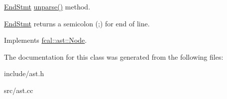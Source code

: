 \hyperlink{classfcal_1_1ast_1_1EndStmt}{End\+Stmt} \hyperlink{classfcal_1_1ast_1_1EndStmt_ab1900c9948ccc1a1cd8eca29cebb9baa}{unparse()} method. 

\hyperlink{classfcal_1_1ast_1_1EndStmt}{End\+Stmt} returns a semicolon (;) for end of line. 

Implements \hyperlink{classfcal_1_1ast_1_1Node_a81865f5a1df593708a39bf492952742a}{fcal\+::ast\+::\+Node}.



The documentation for this class was generated from the following files\+:\begin{DoxyCompactItemize}
\item 
include/ast.\+h\item 
src/ast.\+cc\end{DoxyCompactItemize}
